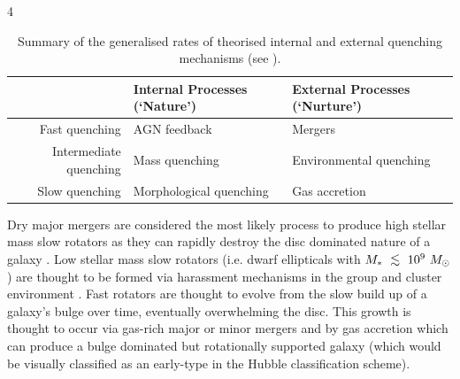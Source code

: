 \documentclass[useAMS,usenatbib]{mn2e}
\def\lesssim{\mathrel{\hbox{\rlap{\hbox{\lower3pt\hbox{$\sim$}}}\hbox{\raise2pt\hbox{$<$}}}}}
\begin{document}
4
\begin{table}
\centering
\caption{Summary of the generalised rates of theorised internal and external quenching mechanisms (see \protect\citealt{smethurst17}).}
\label{table:qm}
%
\begin{tabularx}{\textwidth}{r|C|C}
\hline
{}  & Internal Processes (`Nature')      & External Processes (`Nurture')     \\ \hline
Fast quenching         & AGN feedback            & Mergers           \\
Intermediate quenching & Mass quenching          & Environmental quenching \\
Slow quenching         & Morphological quenching & Gas accretion           \\ \hline
\end{tabularx}
\end{table}

Dry major mergers are considered the most likely process to produce high stellar mass slow rotators \citep{duc11, naab14} as they can rapidly destroy the disc dominated nature of a galaxy \citep{toomre72}. Low stellar mass slow rotators (i.e. dwarf ellipticals with $M_*~\lesssim~10^9~M_{\odot}$) are thought to be formed via harassment mechanisms in the group and cluster environment \citep{toloba15}. %
Fast rotators are thought to evolve from the slow build up of a galaxy's bulge over time, eventually overwhelming the disc. This growth is thought to occur via gas-rich major or minor mergers \citep{duc11} and by gas accretion \citep{cappellari13, johnston14} which can produce a bulge dominated but rotationally supported galaxy (which would be visually classified as an early-type in the Hubble classification scheme). %
\end{document}

